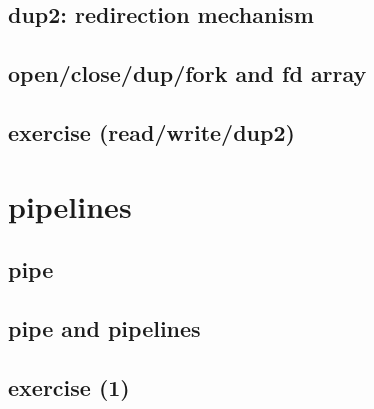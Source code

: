 

\subsection{dup2: redirection mechanism}



\subsection{open/close/dup/fork and fd array}



\subsection{exercise (read/write/dup2)}



\section{pipelines}

\subsection{pipe}



\subsection{pipe and pipelines}




\subsection{exercise (1)}

